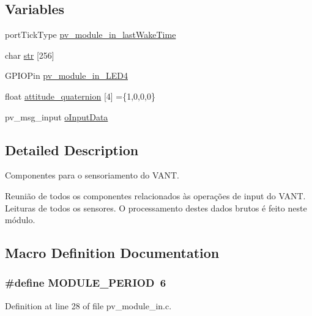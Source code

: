 \subsection*{Variables}
\begin{DoxyCompactItemize}
\item 
port\+Tick\+Type \hyperlink{group__app__in_ga3ff9efc032b26284423c9100a5474b7b}{pv\+\_\+module\+\_\+in\+\_\+last\+Wake\+Time}
\item 
char \hyperlink{group__app__in_ga3000f858ecb5a5417c1566b691efd56d}{str} \mbox{[}256\mbox{]}
\item 
G\+P\+I\+O\+Pin \hyperlink{group__app__in_ga8d3f5e0ec53e4667efbebf11383765e4}{pv\+\_\+module\+\_\+in\+\_\+\+L\+E\+D4}
\item 
float \hyperlink{group__app__in_ga926ba5b807f8b3d71b9fb486eb32a508}{attitude\+\_\+quaternion} \mbox{[}4\mbox{]} =\{1,0,0,0\}
\item 
pv\+\_\+msg\+\_\+input \hyperlink{group__app__in_gaffc6f7805bab2d46af160c6f7715ba99}{o\+Input\+Data}
\end{DoxyCompactItemize}


\subsection{Detailed Description}
Componentes para o sensoriamento do V\+A\+NT. 

Reunião de todos os componentes relacionados às operações de input do V\+A\+NT. Leituras de todos os sensores. O processamento destes dados brutos é feito neste módulo. 

\subsection{Macro Definition Documentation}
\subsubsection[{\texorpdfstring{M\+O\+D\+U\+L\+E\+\_\+\+P\+E\+R\+I\+OD}{MODULE_PERIOD}}]{\setlength{\rightskip}{0pt plus 5cm}\#define M\+O\+D\+U\+L\+E\+\_\+\+P\+E\+R\+I\+OD~6}\hypertarget{group__app__in_ga0ac6c9f2991b096e49c354e5cce6fae0}{}\label{group__app__in_ga0ac6c9f2991b096e49c354e5cce6fae0}


Definition at line 28 of file pv\+\_\+module\+\_\+in.\+c.



